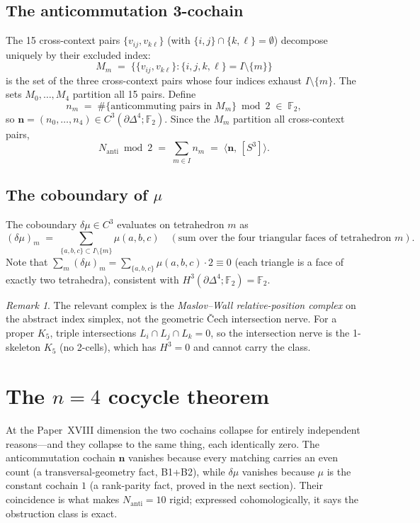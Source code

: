 \documentclass[11pt,a4paper]{article}
\theoremstyle{remark}
\newtheorem*{remark*}{Remark}
\newcommand{\F}{\mathbb{F}}
\newcommand{\Nanti}{N_{\mathrm{anti}}}
\begin{document}
\subsection{The anticommutation 3-cochain}

The 15 cross-context pairs $\{v_{ij},v_{k\ell}\}$ (with
$\{i,j\}\cap\{k,\ell\}=\emptyset$) decompose uniquely by their excluded index:
\[
  M_m \;=\; \bigl\{\{v_{ij},v_{k\ell}\} :
    \{i,j,k,\ell\}=I\setminus\{m\}\bigr\}
\]
is the set of the three cross-context pairs whose four indices exhaust
$I\setminus\{m\}$.  The sets $M_0,\ldots,M_4$ partition all 15 pairs.
Define
\[
  n_m \;=\; \#\{\text{anticommuting pairs in }M_m\} \bmod 2 \;\in\;\F_2,
\]
so $\mathbf{n}=(n_0,\ldots,n_4)\in C^3(\partial\Delta^4;\F_2)$.
Since the $M_m$ partition all cross-context pairs,
\begin{equation}\label{eq:nanti}
  \Nanti \bmod 2 \;=\; \sum_{m\in I} n_m
  \;=\; \langle\mathbf{n},\,[S^3]\rangle.
\end{equation}

\subsection{The coboundary of $\mu$}

The coboundary $\delta\mu\in C^3$ evaluates on tetrahedron $m$ as
\[
  (\delta\mu)_m \;=\;
  \sum_{\{a,b,c\}\subset I\setminus\{m\}} \mu(a,b,c)
  \quad(\text{sum over the four triangular faces of tetrahedron }m).
\]
Note that $\sum_m(\delta\mu)_m=\sum_{\{a,b,c\}}\mu(a,b,c)\cdot 2\equiv0$
(each triangle is a face of exactly two tetrahedra), consistent with
$H^3(\partial\Delta^4;\F_2)=\F_2$.

\begin{remark*}
The relevant complex is the \emph{Maslov--Wall relative-position complex}
on the abstract index simplex, not the geometric \v{C}ech intersection nerve.
For a proper $K_5$, triple intersections $L_i\cap L_j\cap L_k=0$, so the
intersection nerve is the 1-skeleton $K_5$ (no 2-cells), which has
$H^3=0$ and cannot carry the class.
\end{remark*}

\section{The $n=4$ cocycle theorem}\label{sec:n4theorem}

At the Paper~XVIII dimension the two cochains collapse for entirely independent
reasons---and they collapse to the same thing, each identically zero.  The
anticommutation cochain $\mathbf{n}$ vanishes because every matching carries an
even count (a transversal-geometry fact, B1+B2), while $\delta\mu$ vanishes
because $\mu$ is the constant cochain $1$ (a rank-parity fact, proved in the
next section).  Their coincidence is what makes $\Nanti=10$ rigid; expressed
cohomologically, it says the obstruction class is exact.
\end{document}
